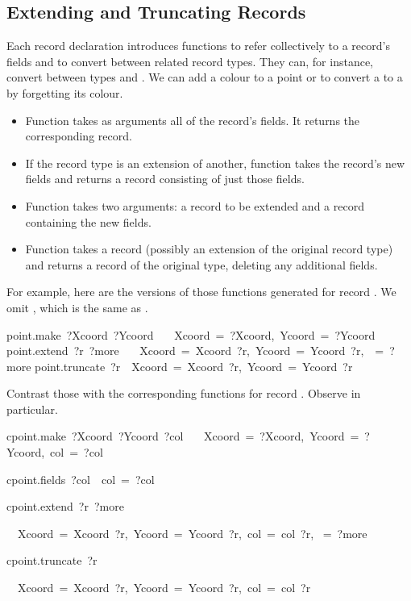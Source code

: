 \subsection{Extending and Truncating Records}

Each record declaration introduces functions to refer collectively to a
record's fields and to convert between related record types.  They can, for
instance, convert between types  and .  We can add a
colour to a point or to convert a  to a  by forgetting
its colour.

\begin{itemize}
\item Function  takes as arguments all of the record's fields.
  It returns the corresponding record. 
\item If the record type is an extension of another, 
      function  takes the record's new fields
      and returns a record consisting of just those fields.  
\item Function  takes two arguments: a record to be extended and a
  record containing the new fields.
\item Function  takes a record (possibly an extension of the
  original record type) and returns a record of the original type, deleting
  any additional fields.
\end{itemize}

For example, here are the versions of those functions generated for record
.  We omit , which is the same as 
.
\begin{isabelle}
point.make\ ?Xcoord\ ?Ycoord\ \isasymequiv \isanewline\smallskip
\ \ \isasymlparr Xcoord\ =\ ?Xcoord,\ Ycoord\ =\ ?Ycoord\isasymrparr \isanewline
point.extend\ ?r\ ?more\ \isasymequiv \isanewline\smallskip
\ \ \isasymlparr Xcoord\ =\ Xcoord\ ?r,\ Ycoord\ =\ Ycoord\ ?r,\ \isasymdots \ =\ ?more\isasymrparr \isanewline\smallskip
point.truncate\ ?r\ \isasymequiv \ \isasymlparr Xcoord\ =\ Xcoord\ ?r,\ Ycoord\ =\ Ycoord\ ?r\isasymrparr 
\end{isabelle}

Contrast those with the corresponding functions for record .
Observe  in particular.
\begin{isabelle}
cpoint.make\ ?Xcoord\ ?Ycoord\ ?col\ \isasymequiv \isanewline
\ \ \isasymlparr Xcoord\ =\ ?Xcoord,\ Ycoord\ =\ ?Ycoord,\ col\ =\ ?col\isasymrparr \par\smallskip
cpoint.fields\ ?col\ \isasymequiv \ \isasymlparr col\ =\ ?col\isasymrparr \par\smallskip
cpoint.extend\ ?r\ ?more\ \isasymequiv \par
\ \ \isasymlparr Xcoord\ =\ Xcoord\ ?r,\ Ycoord\ =\ Ycoord\ ?r,\ col\ =\ col\ ?r,\isanewline
\isaindent{\ \ \ }\isasymdots \ =\ ?more\isasymrparr \par\smallskip
cpoint.truncate\ ?r\ \isasymequiv \par
\ \ \isasymlparr Xcoord\ =\ Xcoord\ ?r,\ Ycoord\ =\ Ycoord\ ?r,\ col\ =\ col\ ?r\isasymrparr 
\end{isabelle}


